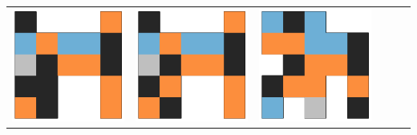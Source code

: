 \begin{tabular}{cccccc}
    \rule{0pt}{9ex}  
    \includegraphics[scale=0.1]{images/top_designs/walker/ga/ga3_gen29_ind0} &
    \includegraphics[scale=0.1]{images/top_designs/walker/ga/ga3_gen29_ind1} &
    \includegraphics[scale=0.1]{images/top_designs/walker/ga/ga3_gen29_ind2} &

\end{tabular}
